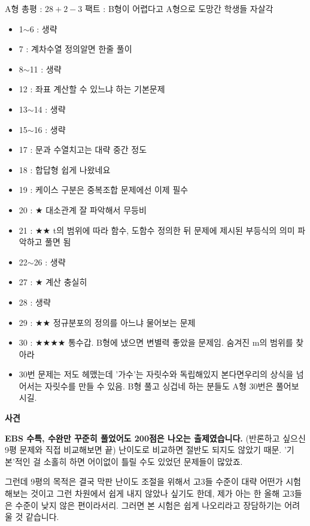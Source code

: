 A형 총평 : $28+2-3$
팩트 : B형이 어렵다고 A형으로 도망간 학생들 자살각
\vspace{5mm}
\begin{itemize}
    \item 1$\sim$6 : 생략
    \item 7 : 계차수열 정의알면 한줄 풀이
    \item 8$\sim$11 : 생략
    \item 12 : 좌표 계산할 수 있느냐 하는 기본문제
    \item 13$\sim$14 : 생략
    \item 15$\sim$16 : 생략
    \item 17 : 문과 수열치고는 대략 중간 정도
    \item 18 : 합답형 쉽게 나왔네요
    \item 19 : 케이스 구분은 중복조합 문제에선 이제 필수
    \item 20 : $\bigstar$ 대소관계 잘 파악해서 무등비
    \item 21 : $\bigstar$$\bigstar$ t의 범위에 따라 함수, 도함수 정의한 뒤 문제에 제시된 부등식의 의미 파악하고 풀면 됨
    \item 22$\sim$26 : 생략
    \item 27 : $\bigstar$ 계산 충실히
    \item 28 : 생략
    \item 29 : $\bigstar$$\bigstar$ 정규분포의 정의를 아느냐 물어보는 문제
    \item 30 : $\bigstar$$\bigstar$$\bigstar$$\bigstar$ 통수갑. B형에 냈으면 변별력 좋았을 문제임. 숨겨진 m의 범위를 찾아라
    \item 30번 문제는 저도 헤맸는데 '가수'는 자릿수와 독립해있지 본다면우리의 상식을 넘어서는 자릿수를 만들 수 있음.
    B형 풀고 싱겁네 하는 분들도 A형 30번은 풀어보시길.
\end{itemize}
\vspace{5mm}

\textbf{사견}
\vspace{5mm}

\textbf{​EBS 수특, 수완만 꾸준히 풀었어도 200점은 나오는 출제였습니다.}
(반론하고 싶으신 9평 문제와 직접 비교해보면 끝) 난이도로 비교하면 절반도 되지도 않았기 때문.
'기본'적인 걸 소홀히 하면 어이없이 틀릴 수도 있었던 문제들이 많았죠.
\vspace{5mm}

그런데 9평의 목적은 결국 막판 난이도 조절을 위해서 고3들 수준이 대략 어떤가 시험해보는 것이고
그런 차원에서 쉽게 내지 않았나 싶기도 한데, 제가 아는 한 올해 고3들은 수준이 낮지 않은 편이라서리.
그러면 본 시험은 쉽게 나오리라고 장담하기는 어려울 것 같습니다.
\vspace{5mm}

